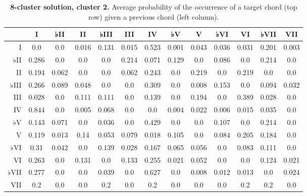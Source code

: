 \begin{table}[htbp]
\begin{minipage}{\linewidth}
\setlength{\tymax}{0.5\linewidth}
\centering
\small
\caption{\textbf{8-cluster solution, cluster 2.} Average probability of the occurrence of a target chord (top row) given a previous chord (left column).}
\label{8-clustersolutioncluster2.averageprobabilityoftheoccurrenceofatargetchordtoprowgivenapreviouschordleftcolumn.}
\begin{tabulary}{\textwidth}{@{}RCCCCCCCCCCCC@{}} \toprule
&I&♭II&II&♭III&III&IV&♭V&V&♭VI&VI&♭VII&VII\\
\midrule
I&0.0&0.0&0.016&0.131&0.015&0.523&0.001&0.043&0.036&0.031&0.201&0.003\\
♭II&0.286&0.0&0.0&0.0&0.214&0.071&0.129&0.0&0.086&0.0&0.214&0.0\\
II&0.194&0.062&0.0&0.0&0.062&0.243&0.0&0.219&0.0&0.219&0.0&0.0\\
♭III&0.266&0.089&0.048&0.0&0.0&0.309&0.0&0.008&0.153&0.0&0.094&0.032\\
III&0.028&0.0&0.111&0.111&0.0&0.139&0.0&0.194&0.0&0.389&0.028&0.0\\
IV&0.844&0.0&0.005&0.068&0.0&0.0&0.004&0.022&0.006&0.015&0.035&0.0\\
♭V&0.143&0.071&0.0&0.036&0.0&0.429&0.0&0.0&0.107&0.0&0.214&0.0\\
V&0.119&0.013&0.14&0.053&0.079&0.018&0.105&0.0&0.084&0.205&0.184&0.0\\
♭VI&0.31&0.042&0.0&0.139&0.028&0.167&0.065&0.056&0.0&0.083&0.111&0.0\\
VI&0.263&0.0&0.131&0.0&0.133&0.255&0.021&0.052&0.0&0.0&0.124&0.021\\
♭VII&0.277&0.0&0.0&0.039&0.0&0.627&0.0&0.008&0.012&0.013&0.0&0.024\\
VII&0.2&0.0&0.0&0.2&0.0&0.2&0.0&0.0&0.0&0.2&0.2&0.0\\

\bottomrule

\end{tabulary}
\end{minipage}
\end{table}

